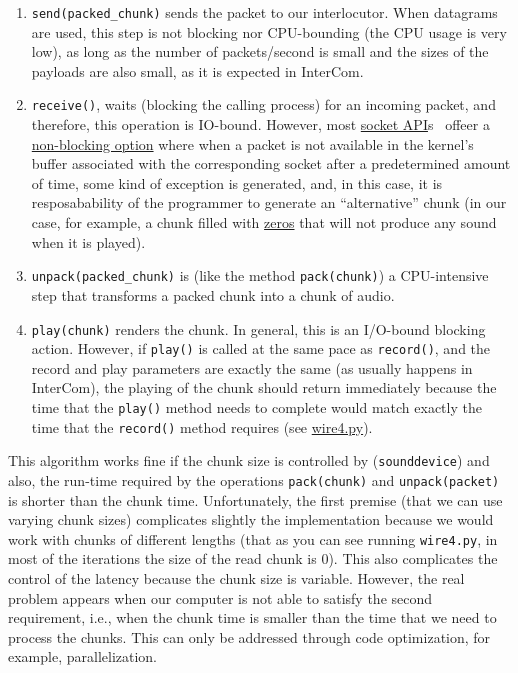 \begin{enumerate}
\item \verb|send(packed_chunk)| sends the packet to our
  interlocutor. When datagrams are used, this step is not blocking nor
  CPU-bounding (the CPU usage is very low), as long as the number of
  packets/second is small and the sizes of the payloads are also
  small, as it is expected in InterCom.

\item \verb|receive()|, waits (blocking the calling process) for an
  incoming packet, and therefore, this operation is IO-bound. However,
  most \href{https://docs.python.org/3/library/socket.html}{socket
    API}s~\cite{python} offeer a
  \href{https://docs.python.org/3.8/library/socket.html#socket.socket.setblocking}{non-blocking
    option} where when a packet is not available in the kernel's
  buffer associated with the corresponding socket after a
  predetermined amount of time, some kind of exception is generated,
  and, in this case, it is resposabability of the programmer to
  generate an ``alternative'' chunk (in our case, for example, a chunk
  filled with
  \href{https://en.wikipedia.org/wiki/Digital_audio#Overview}{zeros}
  that will not produce any sound when it is played).

\item \verb|unpack(packed_chunk)| is (like the method
  \texttt{pack(chunk)}) a CPU-intensive step that transforms a
  packed chunk into a chunk of audio.

\item \verb|play(chunk)| renders the chunk. In general, this is an
  I/O-bound blocking action. However, if \verb|play()| is called at
  the same pace as \verb|record()|, and the record and play parameters
  are exactly the same (as usually happens in InterCom), the playing of
  the chunk should return immediately because the time that the
  \verb|play()| method needs to complete would match exactly the time
  that the \verb|record()| method requires (see
  \href{https://github.com/Tecnologias-multimedia/InterCom/blob/master/test/sounddevice/wire4.py}{wire4.py}).
\end{enumerate}

This algorithm works fine if the chunk size is controlled by
(\verb|sounddevice|) and also, the run-time required by the operations
\verb|pack(chunk)| and \verb|unpack(packet)| is shorter than the chunk
time. Unfortunately, the first premise (that we can use varying chunk
sizes) complicates slightly the implementation because we would work
with chunks of different lengths (that as you can see running
\verb|wire4.py|, in most of the iterations the size of the read chunk
is 0). This also complicates the control of the latency because the
chunk size is variable. However, the real problem appears when our
computer is not able to satisfy the second requirement, i.e., when the
chunk time is smaller than the time that we need to process the
chunks. This can only be addressed through code optimization, for
example, parallelization.

